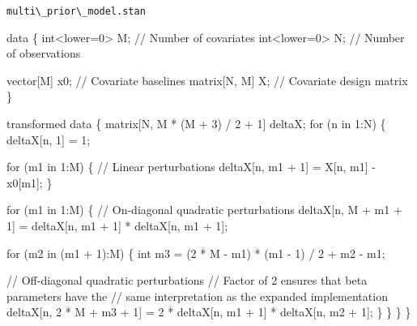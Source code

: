 \documentclass[
  letterpaper,
  DIV=11,
  numbers=noendperiod]{scrartcl}
\newenvironment{Shaded}{\begin{snugshade}}{\end{snugshade}}
\newcommand{\CommentTok}[1]{\textcolor[rgb]{0.37,0.37,0.37}{#1}}
\newcommand{\ControlFlowTok}[1]{\textcolor[rgb]{0.00,0.23,0.31}{#1}}
\newcommand{\DataTypeTok}[1]{\textcolor[rgb]{0.68,0.00,0.00}{#1}}
\newcommand{\DecValTok}[1]{\textcolor[rgb]{0.68,0.00,0.00}{#1}}
\newcommand{\KeywordTok}[1]{\textcolor[rgb]{0.00,0.23,0.31}{#1}}
\newcommand{\NormalTok}[1]{\textcolor[rgb]{0.00,0.23,0.31}{#1}}
\begin{document}
\begin{codelisting}

\caption{\texttt{multi\textbackslash\_prior\textbackslash\_model.stan}}

\begin{Shaded}
\begin{Highlighting}[]
\KeywordTok{data}\NormalTok{ \{}
  \DataTypeTok{int}\NormalTok{\textless{}}\KeywordTok{lower}\NormalTok{=}\DecValTok{0}\NormalTok{\textgreater{} M;  }\CommentTok{// Number of covariates}
  \DataTypeTok{int}\NormalTok{\textless{}}\KeywordTok{lower}\NormalTok{=}\DecValTok{0}\NormalTok{\textgreater{} N;  }\CommentTok{// Number of observations}
  
  \DataTypeTok{vector}\NormalTok{[M] x0;    }\CommentTok{// Covariate baselines}
  \DataTypeTok{matrix}\NormalTok{[N, M] X;  }\CommentTok{// Covariate design matrix}
\NormalTok{\}}

\KeywordTok{transformed data}\NormalTok{ \{}
  \DataTypeTok{matrix}\NormalTok{[N, M * (M + }\DecValTok{3}\NormalTok{) / }\DecValTok{2}\NormalTok{ + }\DecValTok{1}\NormalTok{] deltaX;}
  \ControlFlowTok{for}\NormalTok{ (n }\ControlFlowTok{in} \DecValTok{1}\NormalTok{:N) \{}
\NormalTok{    deltaX[n, }\DecValTok{1}\NormalTok{] = }\DecValTok{1}\NormalTok{;}
    
    \ControlFlowTok{for}\NormalTok{ (m1 }\ControlFlowTok{in} \DecValTok{1}\NormalTok{:M) \{}
      \CommentTok{// Linear perturbations}
\NormalTok{      deltaX[n, m1 + }\DecValTok{1}\NormalTok{] = X[n, m1] {-} x0[m1];}
\NormalTok{    \}}
    
    \ControlFlowTok{for}\NormalTok{ (m1 }\ControlFlowTok{in} \DecValTok{1}\NormalTok{:M) \{}
      \CommentTok{// On{-}diagonal quadratic perturbations}
\NormalTok{      deltaX[n, M + m1 + }\DecValTok{1}\NormalTok{] }
\NormalTok{        = deltaX[n, m1 + }\DecValTok{1}\NormalTok{] * deltaX[n, m1 + }\DecValTok{1}\NormalTok{];}
  
      \ControlFlowTok{for}\NormalTok{ (m2 }\ControlFlowTok{in}\NormalTok{ (m1 + }\DecValTok{1}\NormalTok{):M) \{}
        \DataTypeTok{int}\NormalTok{ m3 = (}\DecValTok{2}\NormalTok{ * M {-} m1) * (m1 {-} }\DecValTok{1}\NormalTok{) / }\DecValTok{2}\NormalTok{ + m2 {-} m1;}
          
        \CommentTok{// Off{-}diagonal quadratic perturbations}
        \CommentTok{// Factor of 2 ensures that beta parameters have the}
        \CommentTok{// same interpretation as the expanded implementation}
\NormalTok{        deltaX[n, }\DecValTok{2}\NormalTok{ * M + m3 + }\DecValTok{1}\NormalTok{] }
\NormalTok{          = }\DecValTok{2}\NormalTok{ * deltaX[n, m1 + }\DecValTok{1}\NormalTok{] * deltaX[n, m2 + }\DecValTok{1}\NormalTok{];}
\NormalTok{      \}}
\NormalTok{    \}}
\NormalTok{  \}}
\NormalTok{\}}


\end{Highlighting}
\end{Shaded}
\end{codelisting}
\end{document}
